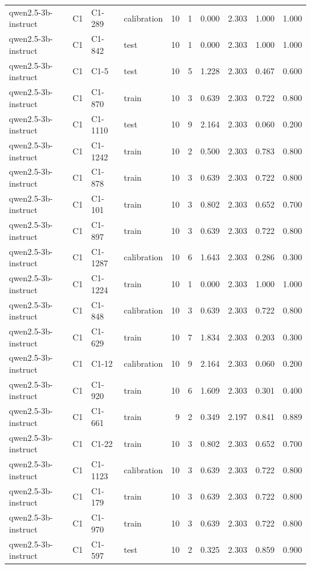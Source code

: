 \begin{table}
\begin{tabular}{llllrrrrrr}
qwen2.5-3b-instruct & C1 & C1-289 & calibration & 10 & 1 & 0.000 & 2.303 & 1.000 & 1.000 \\
qwen2.5-3b-instruct & C1 & C1-842 & test & 10 & 1 & 0.000 & 2.303 & 1.000 & 1.000 \\
qwen2.5-3b-instruct & C1 & C1-5 & test & 10 & 5 & 1.228 & 2.303 & 0.467 & 0.600 \\
qwen2.5-3b-instruct & C1 & C1-870 & train & 10 & 3 & 0.639 & 2.303 & 0.722 & 0.800 \\
qwen2.5-3b-instruct & C1 & C1-1110 & test & 10 & 9 & 2.164 & 2.303 & 0.060 & 0.200 \\
qwen2.5-3b-instruct & C1 & C1-1242 & train & 10 & 2 & 0.500 & 2.303 & 0.783 & 0.800 \\
qwen2.5-3b-instruct & C1 & C1-878 & train & 10 & 3 & 0.639 & 2.303 & 0.722 & 0.800 \\
qwen2.5-3b-instruct & C1 & C1-101 & train & 10 & 3 & 0.802 & 2.303 & 0.652 & 0.700 \\
qwen2.5-3b-instruct & C1 & C1-897 & train & 10 & 3 & 0.639 & 2.303 & 0.722 & 0.800 \\
qwen2.5-3b-instruct & C1 & C1-1287 & calibration & 10 & 6 & 1.643 & 2.303 & 0.286 & 0.300 \\
qwen2.5-3b-instruct & C1 & C1-1224 & train & 10 & 1 & 0.000 & 2.303 & 1.000 & 1.000 \\
qwen2.5-3b-instruct & C1 & C1-848 & calibration & 10 & 3 & 0.639 & 2.303 & 0.722 & 0.800 \\
qwen2.5-3b-instruct & C1 & C1-629 & train & 10 & 7 & 1.834 & 2.303 & 0.203 & 0.300 \\
qwen2.5-3b-instruct & C1 & C1-12 & calibration & 10 & 9 & 2.164 & 2.303 & 0.060 & 0.200 \\
qwen2.5-3b-instruct & C1 & C1-920 & train & 10 & 6 & 1.609 & 2.303 & 0.301 & 0.400 \\
qwen2.5-3b-instruct & C1 & C1-661 & train & 9 & 2 & 0.349 & 2.197 & 0.841 & 0.889 \\
qwen2.5-3b-instruct & C1 & C1-22 & train & 10 & 3 & 0.802 & 2.303 & 0.652 & 0.700 \\
qwen2.5-3b-instruct & C1 & C1-1123 & calibration & 10 & 3 & 0.639 & 2.303 & 0.722 & 0.800 \\
qwen2.5-3b-instruct & C1 & C1-179 & train & 10 & 3 & 0.639 & 2.303 & 0.722 & 0.800 \\
qwen2.5-3b-instruct & C1 & C1-970 & train & 10 & 3 & 0.639 & 2.303 & 0.722 & 0.800 \\
qwen2.5-3b-instruct & C1 & C1-597 & test & 10 & 2 & 0.325 & 2.303 & 0.859 & 0.900 \\

\end{tabular}
\end{table}
